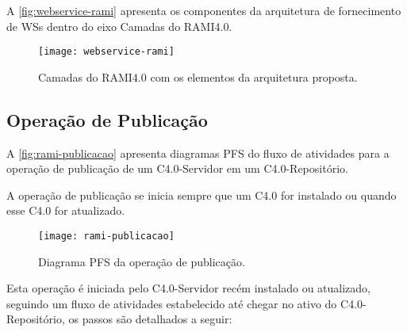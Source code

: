 A \autoref{fig:webservice-rami} apresenta os componentes da arquitetura de fornecimento de WSs dentro do eixo Camadas do RAMI4.0.%


\begin{figure}[H]
	\centering
	\texttt{[image: webservice-rami]}
	\caption{Camadas do RAMI4.0 com os elementos da arquitetura proposta.}
	\label{fig:webservice-rami}
\end{figure}

\subsection{Operação de Publicação}

A \autoref{fig:rami-publicacao} apresenta diagramas PFS do fluxo de atividades para a operação de publicação de um C4.0-Servidor em um C4.0-Repositório.

A operação de publicação se inicia sempre que um C4.0 for instalado ou quando esse C4.0 for atualizado.

\begin{figure}[htb]
	\centering
	\texttt{[image: rami-publicacao]}
	\caption{Diagrama PFS da operação de publicação.}
	\label{fig:rami-publicacao}
\end{figure}

Esta operação é iniciada pelo C4.0-Servidor recém instalado ou atualizado, seguindo um fluxo de atividades estabelecido até chegar no ativo do C4.0-Repositório, os passos são detalhados a seguir:

